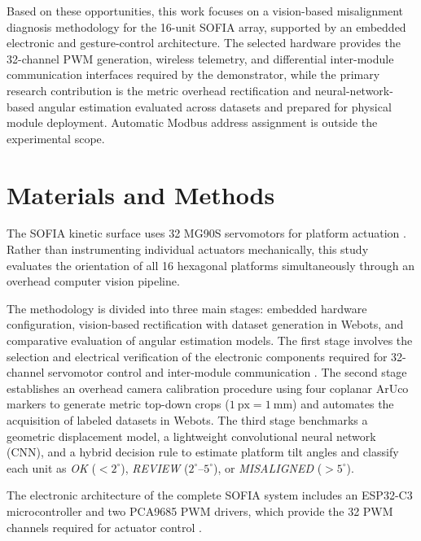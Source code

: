 \documentclass[lettersize,journal]{IEEEtran}
\begin{document}
	Based on these opportunities, this work focuses on a vision-based misalignment diagnosis methodology for the 16-unit SOFIA array, supported by an embedded electronic and gesture-control architecture. The selected hardware provides the 32-channel PWM generation, wireless telemetry, and differential inter-module communication interfaces required by the demonstrator, while the primary research contribution is the metric overhead rectification and neural-network-based angular estimation evaluated across datasets and prepared for physical module deployment. Automatic Modbus address assignment is outside the experimental scope.
	
	
	\section{Materials and Methods}
	\label{sec:methods}
	
	The SOFIA kinetic surface uses 32 MG90S servomotors for platform actuation \cite{sofia_architecture,mg90s}. Rather than instrumenting individual actuators mechanically, this study evaluates the orientation of all 16 hexagonal platforms simultaneously through an overhead computer vision pipeline.

	The methodology is divided into three main stages: embedded hardware configuration, vision-based rectification with dataset generation in Webots, and comparative evaluation of angular estimation models. The first stage involves the selection and electrical verification of the electronic components required for 32-channel servomotor control and inter-module communication \cite{technical_session}. The second stage establishes an overhead camera calibration procedure using four coplanar ArUco markers to generate metric top-down crops ($1~\text{px} = 1~\text{mm}$) and automates the acquisition of labeled datasets in Webots. The third stage benchmarks a geometric displacement model, a lightweight convolutional neural network (CNN), and a hybrid decision rule to estimate platform tilt angles and classify each unit as \textit{OK} ($<2^\circ$), \textit{REVIEW} ($2^\circ\text{--}5^\circ$), or \textit{MISALIGNED} ($>5^\circ$).
	
	The electronic architecture of the complete SOFIA system includes an ESP32-C3 microcontroller and two PCA9685 PWM drivers, which provide the 32 PWM channels required for actuator control \cite{sofia_architecture,esp32c3,pca9685}.
	
\end{document}
